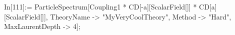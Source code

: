 In[111]:= ParticleSpectrum[Coupling1 * CD[-a][ScalarField[]] * CD[a][ScalarField[]], TheoryName -> "MyVeryCoolTheory", Method -> "Hard", MaxLaurentDepth -> 4]; 